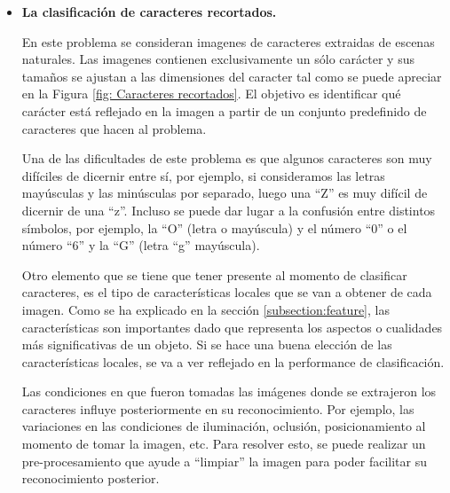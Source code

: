 	\begin{itemize}
		\item \textbf{La clasificación de caracteres recortados.}
		
		En este problema se consideran imagenes de caracteres extraidas de escenas naturales. Las imagenes contienen exclusivamente un sólo carácter y sus tamaños se ajustan a las dimensiones del caracter tal como se puede apreciar en la Figura \ref{fig: Caracteres recortados}. El objetivo es identificar qué carácter está reflejado en la imagen a partir de un conjunto predefinido de caracteres que hacen al problema.

		Una de las dificultades de este problema es que algunos caracteres son muy difíciles de dicernir entre sí, por ejemplo, si consideramos las letras mayúsculas y las minúsculas por separado, luego una ``Z'' es muy difícil de dicernir de una ``z''. Incluso se puede dar lugar a la confusión entre distintos símbolos, por ejemplo, la ``O'' (letra o mayúscula) y el número ``0'' o el número ``6'' y la ``G'' (letra ``g'' mayúscula).
						
		Otro elemento que se tiene que tener presente al momento de clasificar caracteres, es el tipo de características locales que se van a obtener de cada imagen. Como se ha explicado en la sección \ref{subsection:feature}, las características son importantes dado que representa los aspectos o cualidades más significativas de un objeto. Si se hace una buena elección de las características locales, se va a ver reflejado en la performance de clasificación.
		
		Las condiciones en que fueron tomadas las imágenes donde se extrajeron los caracteres influye posteriormente en su reconocimiento. Por ejemplo, las variaciones en las condiciones de iluminación, oclusión, posicionamiento al momento de tomar la imagen, etc. Para resolver esto, se puede realizar un pre-procesamiento que ayude a ``limpiar'' la imagen para poder facilitar su reconocimiento posterior.
		

\end{itemize}
